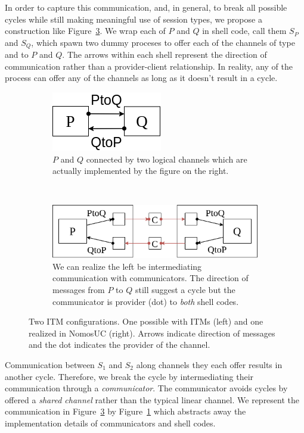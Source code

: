 In order to capture this communication, and, in general, to break all possible cycles while still making meaningful use of session types, we propose a construction like Figure~\ref{fig:newpandq}.
We wrap each of $P$ and $Q$ in shell code, call them $S_P$ and $S_Q$, which spawn two dummy proceses to offer each of the channels of type  and  to $P$ and $Q$.
The arrows within each shell represent the direction of communication rather than a provider-client relationship. 
In reality, any of the process can offer any of the channels as long as it doesn't result in a cycle.
\begin{figure}
	\begin{subfigure}{0.3\textwidth}
	\centering
	\includegraphics[scale=0.4]{figures/p_and_q.png}
	\caption{$P$ and $Q$ connected by two logical channels which are actually implemented by the figure on the right.}
	\label{fig:pandq}
	\end{subfigure}
	~ \ \ \ \ 
	\begin{subfigure}{0.6\textwidth}
	\centering
	\includegraphics[scale=0.4]{figures/new_p_and_q.png}
	\caption{We can realize the left be intermediating communication with communicators. The direction of messages from $P$ to $Q$ still suggest a cycle but the communicator is provider (dot) to \emph{both} shell codes.}
	\label{fig:newpandq}
	\end{subfigure}
	\caption{Two ITM configurations. One possible with ITMs (left) and one realized in NomosUC (right). Arrows indicate direction of messages and the dot indicates the provider of the channel.}
\end{figure}
Communication between $S_1$ and $S_2$ along channels they each offer results in another cycle. 
Therefore, we break the cycle by intermediating their communication through a \emph{communicator}.
The communicator avoids cycles by offered a \emph{shared channel} rather than the typical linear channel.
We represent the communication in Figure~\ref{fig:newpandq} by Figure~\ref{fig:pandq} which abstracts away the implementation details of communicators and shell codes.


